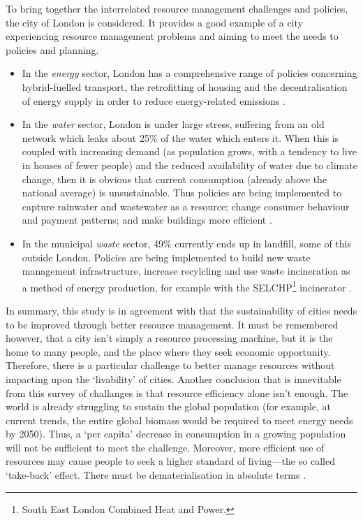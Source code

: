 To bring together the interrelated resource management challenges and policies, the city of London is considered. It provides a good example of a city experiencing resource management problems and aiming to meet the needs to policies and planning. 
\begin{itemize}
	\item In the \emph{energy} sector, London has a comprehensive range of policies concerning hybrid-fuelled transport, the retrofitting of housing and the decentralisation of energy supply in order to reduce energy-related emissions \citep{Strategy2011}. 
	\item In the \emph{water} sector, London is under large stress, suffering from an old network which leaks about 25\% of the water which enters it. When this is coupled with increasing demand (as population grows, with a tendency to live in houses of fewer people) and the reduced availability of water due to climate change, then it is obvious that current consumption (already above the national average) is unsustainable. Thus policies are being implemented to capture rainwater and wastewater as a resource; change consumer behaviour and payment patterns; and make buildings more efficient \citep{Nickson2011}. 
	\item In the municipal \emph{waste} sector, 49\% currently ends up in landfill, some of this outside London. Policies are being implemented to build new waste management infrastructure, increase recylcling and use waste incineration as a method of energy production, for example with the SELCHP\footnote{South East London Combined Heat and Power.} incinerator \citep{Zabal2011}.
\end{itemize}

In summary, this study is in agreement with \citet{Newman1999} that the sustainability of cities needs to be improved through better resource management. It must be remembered however, that a city isn't simply a resource processing machine, but it is the home to many people, and the place where they seek economic opportunity.  Therefore, there is a particular challenge to better manage resources without impacting upon the `livability' of cities. Another conclusion that is innevitable from this survey of challanges is that resource efficiency alone isn't enough. The world is already struggling to sustain the global population (for example, at current trends, the entire global biomass would be required to meet energy needs by 2050). Thus, a `per capita' decrease in consumption in a growing population will not be sufficient to meet the challenge. Moreover, more efficient use of resources may cause people to seek a higher standard of living---the so called `take-back' effect. There must be dematerialisation in absolute terms \citep{Winiwarter2011}.

